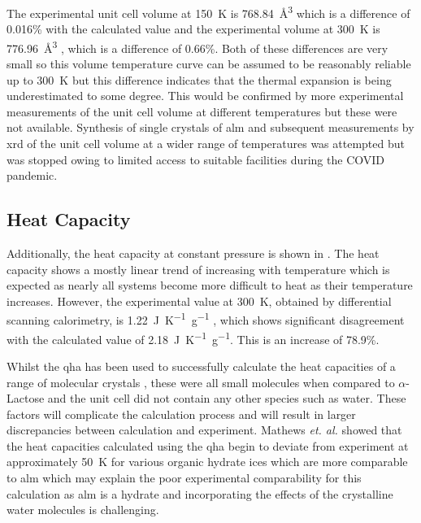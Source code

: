 The experimental unit cell volume at \SI{150}{K} is \SI{768.84}{\angstrom^3} \DIFdelbegin \DIFdel{~}\DIFdelend \cite{Smith2005} which is a difference of 0.016\% with the calculated value and the experimental volume at \SI{300}{K} is \SI{776.96}{\angstrom^3} \DIFdelbegin \DIFdel{~}\DIFdelend \cite{Schreyer2014}, which is a difference of 0.66\%. Both of these differences are very small so this volume temperature curve can be assumed to be reasonably reliable up to \SI{300}{K} but this difference indicates that the thermal expansion is being underestimated to some degree. This would be confirmed by more experimental measurements of the unit cell volume at different temperatures but these were not available. Synthesis of single crystals of \acrshort{alm} and subsequent measurements by \acrshort{xrd} of the unit cell volume at a wider range of temperatures was attempted but was stopped owing to limited access to suitable facilities during the COVID pandemic.

\subsection{Heat Capacity}
Additionally, the heat capacity at constant pressure is shown in . The heat capacity shows a mostly linear trend of increasing with temperature which is expected as nearly all systems become more difficult to heat as their temperature increases. However, the experimental value at \SI{300}{K}, obtained by differential scanning calorimetry, is \SI{1.22}{J K^{-1} g^{-1}} \DIFdelbegin \DIFdel{~}\DIFdelend \cite{Kawaizumi1981}, which shows significant disagreement with the calculated value of \SI{2.18}{J K^{-1} g^{-1}}. This is an increase of 78.9\%. 

Whilst the \acrshort{qha} has been used to successfully calculate the heat capacities of a range of molecular crystals \DIFdelbegin \DIFdel{~}\DIFdelend \cite{Cervinka2016}, these were all small molecules when compared to \(\alpha\)\nobreakdash-Lactose and the unit cell did not contain any other species such as water. These factors will complicate the calculation process and will result in larger discrepancies between calculation and experiment. Mathews \textit{et. al.} \DIFdelbegin \DIFdel{~}\DIFdelend \cite{Mathews2020} showed that the heat capacities calculated using the \acrshort{qha} begin to deviate from experiment at approximately \SI{50}{K} for various organic hydrate ices which are more comparable to \acrshort{alm} which may explain the poor experimental comparability for this calculation as \acrshort{alm} is a hydrate and incorporating the effects of the crystalline water molecules is challenging. 

